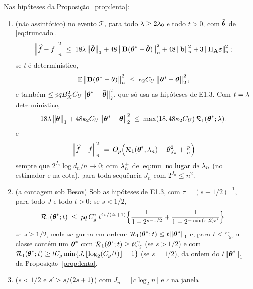 \documentclass[11pt,a4paper]{article}
\newcommand{\Amat}{\mathbf{A}}
\newcommand{\Bmat}{\mathbf{B}}
\newcommand{\PA}{\Pi_{\Amat}}
\newcommand{\bveps}{\boldsymbol{\varepsilon}}
\newcommand{\bb}{\mathbf{b}}
\newcommand{\thbar}{\bar{\btheta}}
\begin{document}
\setcounter{proposition}{7}
\begin{proposition}\label{prop:truncada}
Nas hipóteses da Proposição~\ref{prop:lenta}:
\begin{enumerate}[label=\textup{(\roman*)}, leftmargin=*]
  \item \textup{(não assintótico)} no evento $\mathcal{T}$, para todo
    $\lambda \ge 2\lambda_{0}$ e todo $t > 0$, com $\thbar$ de \eqref{eq:truncado},
    \[
      \normn{\widehat f - f}^{2}
      \;\le\; 18\pen\norm{\thbar}_{1} + 48\normn{\Bmat(\thetastar - \thbar)}^{2}
      + 48\normn{\bb}^{2} + 3\normn{\PA\bveps}^{2};
    \]
    se $t$ é determinístico,
    \[
      \E\normn{\Bmat(\thetastar - \thbar)}^{2}
      \;\le\; \kappa_{2}C_{U}\norm{\thetastar - \thbar}_{2}^{2},
    \]
    e também $\le pqB_{X}^{2}C_{U}\norm{\thetastar - \thbar}_{2}^{2}$, que só
    usa as hipóteses de E1.3. Com $t = \lambda$ determinístico,
    \[
      18\pen\norm{\thbar}_{1} + 48\kappa_{2}C_{U}\norm{\thetastar - \thbar}_{2}^{2}
      \;\le\; \max(18, 48\kappa_{2}C_{U})\,\mathcal{R}_{1}(\thetastar;\pen),
    \]
    e
    \[
      \left\lVert \widehat f - f \right\rVert_{n}^{2}
      \;=\; O_{p}\Bigl(\mathcal{R}_{1}(\boldsymbol{\theta}^{*};\lambda_{n})
      + \mathcal{B}_{J_{n}}^{2} + \tfrac{p}{n}\Bigr)
    \]
    sempre que $2^{J_{n}}\log d_{n}/n \to 0$; com $\lambda_{n}^{+}$ de
    \eqref{eq:mu} no lugar de $\lambda_{n}$ (no estimador e na cota), para toda
    sequência $J_{n}$ com $2^{J_{n}} \le n^{2}$.
  \item \textup{(a contagem sob Besov)} Sob as hipóteses de E1.3, com
    $\tau = (s+1/2)^{-1}$, para todo $J$ e todo $t > 0$: se $s < 1/2$,
    \begin{equation}
      \label{eq:contagem-truncada}
      \mathcal{R}_{1}(\boldsymbol{\theta}^{*};t) \;\le\; pq\,C_{g}^{\tau}\,
      t^{4s/(2s+1)}\Bigl\{\frac{1}{1 - 2^{s-1/2}}
      + \frac{1}{1 - 2^{-\min(\pi,2)s'}}\Bigr\};
    \end{equation}
    se $s \ge 1/2$, nada se ganha em ordem: $\mathcal{R}_{1}(\boldsymbol{\theta}^{*};t) \le
    t\left\lVert \boldsymbol{\theta}^{*} \right\rVert_{1}$ e, para $t \le C_{g}$, a classe contém um
    $\boldsymbol{\theta}^{*}$ com $\mathcal{R}_{1}(\boldsymbol{\theta}^{*};t) \ge tC_{g}$ (se $s > 1/2$)
    e com $\mathcal{R}_{1}(\boldsymbol{\theta}^{*};t) \ge tC_{g}\min\{J,
    \lfloor\log_{2}(C_{g}/t)\rfloor + 1\}$ (se $s = 1/2$), da ordem do
    $t\left\lVert \boldsymbol{\theta}^{*} \right\rVert_{1}$ da Proposição~\ref{prop:lenta}.
  \item \textup{($s < 1/2$ e $s' > s/(2s+1)$)} com
    $J_{n} = \lceil c\log_{2}n\rceil$ e $c$ na janela
    \begin{equation}

\end{equation}
\end{enumerate}
\end{proposition}
\end{document}
